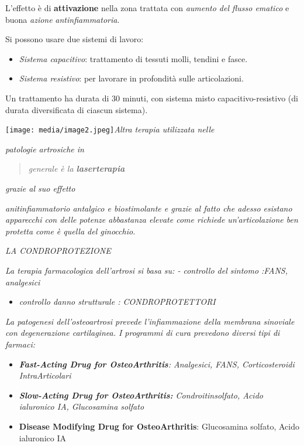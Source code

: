 \documentclass[]{article}
\begin{document}
L'effetto è di \textbf{attivazione} nella zona trattata con
\emph{aumento del flusso ematico} e buona \emph{azione}
\emph{antinfiammatoria}.

Si possono usare due sistemi di lavoro:

\begin{itemize}
\item
  \emph{Sistema capacitivo}: trattamento di tessuti molli, tendini e
  fasce.
\item
  \emph{Sistema resistivo}: per lavorare in profondità sulle
  articolazioni.
\end{itemize}

Un trattamento ha durata di 30 minuti, con sistema misto
capacitivo-resistivo (di durata diversificata di ciascun sistema).

\texttt{[image: media/image2.jpeg]}\emph{Altra
terapia utilizzata nelle}

\emph{patologie artrosiche in}

\begin{quote}
\emph{generale è la \textbf{laserterapia}}
\end{quote}

\emph{grazie al suo effetto}

\emph{anitinfiammatorio antalgico e biostimolante e grazie al fatto che
adesso esistano apparecchi con delle potenze abbastanza elevate come
richiede un'articolazione ben protetta come è quella del ginocchio.}

\emph{LA CONDROPROTEZIONE}

\emph{La terapia farmacologica dell'artrosi si basa su: - controllo del
sintomo :FANS, analgesici}

\begin{itemize}
\item
  \emph{controllo danno strutturale : CONDROPROTETTORI}
\end{itemize}

\emph{La patogenesi dell'osteoartrosi prevede l'infiammazione della
membrana sinoviale con degenerazione cartilaginea. I programmi di cura
prevedono diversi tipi di farmaci:}

\begin{itemize}
\item
  \emph{\textbf{Fast-Acting Drug for OsteoArthritis}: Analgesici, FANS,
  Corticosteroidi IntraArticolari}
\item
  \emph{\textbf{Slow-Acting Drug for OsteoArthritis:} Condroitinsolfato,
  Acido ialuronico IA, Glucosamina solfato}
\item
  \textbf{Disease Modifying Drug for OsteoArthritis}: Glucosamina
  solfato, Acido ialuronico IA
\end{itemize}
\end{document}

